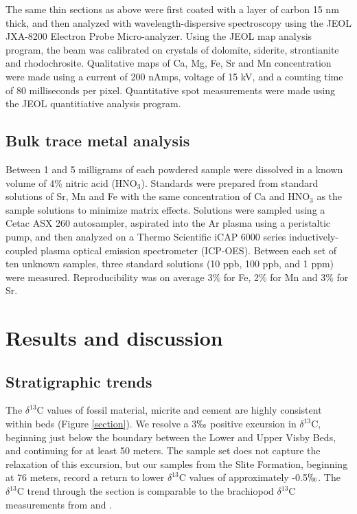 \documentclass{article}
\newcommand{\deltac}{$\delta^{13}$}
\begin{document}
The same thin sections as above were first coated with a layer of carbon 15 nm thick, and then analyzed with wavelength-dispersive spectroscopy using the JEOL JXA-8200 Electron Probe Micro-analyzer. Using the JEOL map analysis program, the beam was calibrated on crystals of dolomite, siderite, strontianite and rhodochrosite. Qualitative maps of Ca, Mg, Fe, Sr and Mn concentration were made using a current of 200 nAmps, voltage of 15 kV, and a counting time of 80 milliseconds per pixel. Quantitative spot measurements were made using the JEOL quantitiative analysis program. 

\subsection{Bulk trace metal analysis}

Between 1 and 5 milligrams of each powdered sample were dissolved in a known volume of 4\% nitric acid (HNO$_3$). Standards were prepared from standard solutions of Sr, Mn and Fe with the same concentration of Ca and HNO$_3$ as the sample solutions to minimize matrix effects. Solutions were sampled using a Cetac ASX 260 autosampler, aspirated into the Ar plasma using a peristaltic pump, and then analyzed on a Thermo Scientific iCAP 6000 series inductively-coupled plasma optical emission spectrometer (ICP-OES). Between each set of ten unknown samples, three standard solutions (10 ppb, 100 ppb, and 1 ppm) were measured. Reproducibility was on average 3\% for Fe, 2\% for Mn and 3\% for Sr. 

\section{Results and discussion}

\subsection{Stratigraphic trends}

The \deltac C values of fossil material, micrite and cement are highly consistent within beds (Figure \ref{section}). We resolve a 3$\permil$ positive excursion in \deltac C, beginning just below the boundary between the Lower and Upper Visby Beds, and continuing for at least 50 meters. The sample set does not capture the relaxation of this excursion, but our samples from the Slite Formation, beginning at 76 meters, record a return to lower \deltac C values of approximately -0.5$\permil$. The \deltac C trend through the section is comparable to the brachiopod \deltac C measurements from \cite{Bickert1997} and \cite{Munnecke2003}. 
\end{document}

